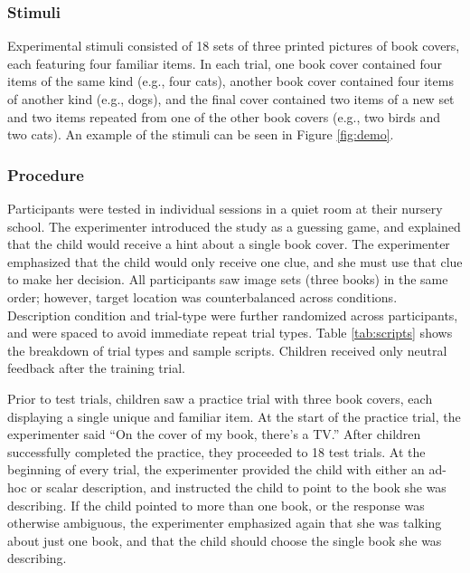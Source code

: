 \documentclass[man]{apa2}
\begin{document}

\subsubsection{Stimuli}

Experimental stimuli consisted of 18 sets of three printed pictures of book covers, each featuring four familiar items. In each trial, one book cover contained four items of the same kind (e.g., four cats), another book cover contained four items of another kind (e.g., dogs), and the final cover contained two items of a new set and two items repeated from one of the other book covers (e.g., two birds and two cats). An example of the stimuli can be seen in Figure \ref{fig:demo}. 

\subsubsection{Procedure}

Participants were tested in individual sessions in a quiet room at their nursery school. The experimenter introduced the study as a guessing game, and explained that the child would receive a hint about a single book cover. The experimenter emphasized that the child would only receive one clue, and she must use that clue to make her decision. All participants saw image sets (three books) in the same order; however, target location was counterbalanced across conditions. Description condition and trial-type were further randomized across participants, and were spaced to avoid immediate repeat trial types. Table \ref{tab:scripts} shows the breakdown of trial types and sample scripts. Children received only neutral feedback after the training trial.

Prior to test trials, children saw a practice trial with three book covers, each displaying a single unique and familiar item. At the start of the practice trial, the experimenter said ``On the cover of my book, there's a TV.'' After children successfully completed the practice, they proceeded to 18 test trials. At the beginning of every trial, the experimenter provided the child with either an ad-hoc or scalar description, and instructed the child to point to the book she was describing. If the child pointed to more than one book, or the response was otherwise ambiguous, the experimenter emphasized again that she was talking about just one book, and that the child should choose the single book she was describing.
\end{document}
